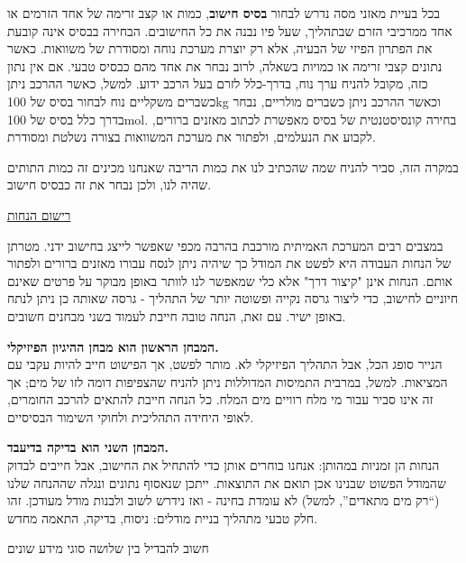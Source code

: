 \documentclass[
  hebrew,
  letterpaper,
  DIV=11,
  numbers=noendperiod]{scrreprt}
\begin{document}
בכל בעיית מאזני מסה נדרש לבחור \textbf{בסיס חישוב}, כמות או קצב זרימה של
אחד הזרמים או אחד ממרכיבי הזרם שבתהליך, שעל פיו נבנה את כל החישובים.
הבחירה בבסיס אינה קובעת את הפתרון הפיזי של הבעיה, אלא רק יוצרת מערכת
נוחה ומסודרת של משוואות. כאשר נתונים קצבי זרימה או כמויות בשאלה, לרוב
נבחר את אחד מהם כבסיס טבעי. אם אין נתון כזה, מקובל להניח ערך נוח,
בדרך-כלל לזרם בעל הרכב ידוע. למשל, כאשר ההרכב ניתן כשברים משקליים נוח
לבחור בסיס של 100kg וכאשר ההרכב ניתן כשברים מולריים, נבחר בדרך כלל בסיס
של 100mol. בחירה קונסיסטנטית של בסיס מאפשרת לכתוב מאזנים ברורים, לקבוע
את הנעלמים, ולפתור את מערכת המשוואות בצורה נשלטת ומסודרת.

במקרה הזה, סביר להניח שמה שהכתיב לנו את כמות הריבה שאנחנו מכינים זה כמות
התותים שהיה לנו, ולכן נבחר את זה כבסיס חישוב.

\ul{רישום הנחות}

במצבים רבים המערכת האמיתית מורכבת בהרבה מכפי שאפשר לייצג בחישוב ידני.
מטרתן של הנחות העבודה היא לפשט את המודל כך שיהיה ניתן לנסח עבורו מאזנים
ברורים ולפתור אותם. הנחות אינן "קיצור דרך" אלא כלי שמאפשר לנו לוותר
באופן מבוקר על פרטים שאינם חיוניים לחישוב, כדי ליצור גרסה נקייה ופשוטה
יותר של התהליך - גרסה שאותה כן ניתן לנתח באופן ישיר. עם זאת, הנחה טובה
חייבת לעמוד בשני מבחנים חשובים.

\textbf{המבחן הראשון הוא מבחן ההיגיון הפיזיקלי.}\\
הנייר סופג הכל, אבל התהליך הפיזיקלי לא. מותר לפשט, אך הפישוט חייב להיות
עקבי עם המציאות. למשל, במרבית התמיסות המדוללות ניתן להניח שהצפיפות דומה
לזו של מים; אך זה אינו סביר עבור מי מלח רוויים מים המלח. כל הנחה חייבת
להתאים להרכב החומרים, לאופי היחידה התהליכית ולחוקי השימור הבסיסיים.

\textbf{המבחן השני הוא בדיקה בדיעבד.}\\
הנחות הן זמניות במהותן: אנחנו בוחרים אותן כדי להתחיל את החישוב, אבל
חייבים לבדוק שהמודל הפשוט שבנינו אכן תואם את התוצאות. ייתכן שנאסוף
נתונים ונגלה שההנחה שלנו (``רק מים מתאדים'', למשל) לא עומדת בחינה - ואז
נידרש לשוב ולבנות מודל מעודכן. זהו חלק טבעי מתהליך בניית מודלים: ניסוח,
בדיקה, התאמה מחדש.

חשוב להבדיל בין שלושה סוגי מידע שונים
\end{document}
